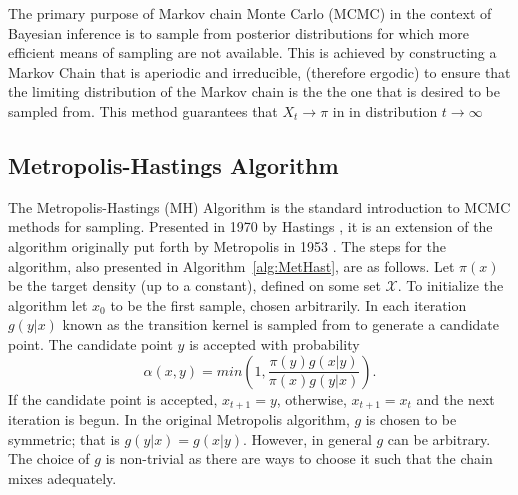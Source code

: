 
	

  The primary purpose of Markov chain Monte Carlo (MCMC) in the context of Bayesian inference is to sample from posterior distributions for which more efficient means of sampling are not available.
	{\color{red}This is achieved by constructing a Markov Chain that is aperiodic and irreducible, (therefore ergodic) to ensure that the limiting distribution of the Markov chain is the the one that is desired to be sampled from. This method guarantees that $X_t\rightarrow\pi$ in in distribution $t\rightarrow\infty$}
	\subsection{Metropolis-Hastings Algorithm}
	The Metropolis-Hastings (MH) Algorithm is the standard introduction to MCMC methods for sampling. Presented in 1970 by Hastings \cite{hastings1970monte}, it is an extension of the algorithm originally put forth by Metropolis in 1953 \cite{metropolis1953equation}.
	The steps for the algorithm, also presented in Algorithm~\ref{alg:MetHast}, are as follows. Let $\pi(x)$ be the target density (up to a constant), defined on some set ${\mathscr X}$.
	To initialize the algorithm let $x_0$ to be the first sample, chosen arbitrarily. In each iteration $g(y|x)$ 
    known as the {\color{red}transition kernel} is sampled from to generate a candidate point. The candidate point $y$ is accepted with probability 
	    \begin{equation}
	        \alpha(x,y) = min\left(1,\frac{\pi(y)g(x|y)}{\pi(x)g(y|x)}\right).
	    \end{equation}
	If the candidate point is accepted, $x_{t+1} = y$, otherwise, $x_{t+1} = x_t$ and the next iteration is begun. In the original Metropolis algorithm, $g$ is chosen to be symmetric; that is $g(y|x) = g(x|y)$. However, in general $g$ can be arbitrary. The choice of $g$ is non-trivial as there are ways to choose it such that the chain mixes adequately. %
	
